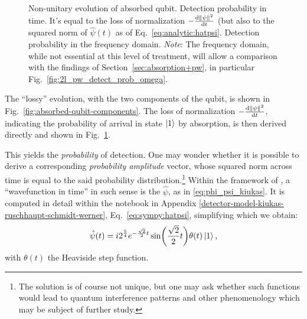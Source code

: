 \begin{figure}
\begin{subfigure}[b]{0.49\textwidth}
  \end{subfigure}
  \caption[
    Non-unitary evolution of absorbed qubit (cont.)
  ]{
    Non-unitary evolution of absorbed qubit.
      Detection probability in time. It's equal to the
      loss of normalization $-\dv{\norm{\psi}^2}{t}$
      (but also to the squared norm of $\hat{\psi}(t)$ as of Eq.~\eqref{eq:analytic:hatpsi}.
      Detection probability in the frequency domain.
    \emph{Note}: The frequency domain,
    while not essential at this level of treatment, 
    will allow a comparison with the findings of Section~\ref{sec:absorption+pw},
    in particular Fig.~\ref{fig:2l_pw_detect_prob_omega}. 
  }
  \label{fig:absorbed-qubit-normalization-loss}
\end{figure}

The ``lossy'' evolution, with the two components of the qubit, is shown in Fig.~\ref{fig:absorbed-qubit-components}.
The loss of normalization $-\dv{\norm{\psi}^2}{t}$, indicating the probability of arrival in state $\ket{1}$ by absorption,
is then derived directly and shown in Fig.~\ref{fig:absorbed-qubit-normalization-loss}.

This yields the \emph{probability} of detection.
One may wonder whether it is possible to derive a corresponding \emph{probability amplitude} vector,
whose squared norm across time is equal to the said probability distribution.\footnote{
  The solution is of course not unique, but one may ask whether such functions would lead
  to quantum interference patterns and other phenomenology which may be subject of further study.
}
Within the framework of \cite{RuschhauptAbsorption}, a ``wavefunction in time'' in such sense
is the $\hat{\psi}$, as in \eqref{eq:phi_psi_kiukas}.
It is computed in detail within the
notebook in Appendix \ref{detector-model-kiukas-ruschhaupt-schmidt-werner}, Eq.~\eqref{eq:sympy:hatpsi},
simplifying which we obtain:
\begin{equation}\label{eq:analytic:hatpsi}
  \hat{\psi}(t) =
    i 2^{\frac{5}{4}} e^{-\frac{\sqrt{2}}{2}t}\sin(\frac{\sqrt{2}}{2}t) \theta(t)
    \ket{1}
    \text{,}
\end{equation}
with $\theta(t)$ the Heaviside step function.



